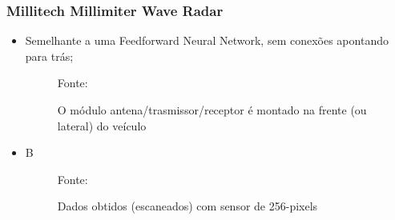 \documentclass[xcolor=dvipsnames, aspectratio=169]{beamer}
\begin{document}
\begin{frame}
\frametitle{Millitech Millimiter Wave Radar}
	\begin{itemize}
		\item Semelhante a uma Feedforward Neural Network, sem conexões apontando para trás;
        \begin{figure}
            \centering
            {Fonte: \cite{everett1995sensors}}
            \caption{O módulo antena/trasmissor/receptor é montado na frente (ou lateral) do veículo}
            \label{fig:curva_de_freq}
        \end{figure}

        \item B
        
        \begin{figure}
            \centering
            {Fonte: \cite{everett1995sensors}}
            \caption{Dados obtidos (escaneados) com sensor de 256-pixels}
            \label{fig:militech_sensor_data}
        \end{figure}



\end{itemize}
\end{frame}
\end{document}
